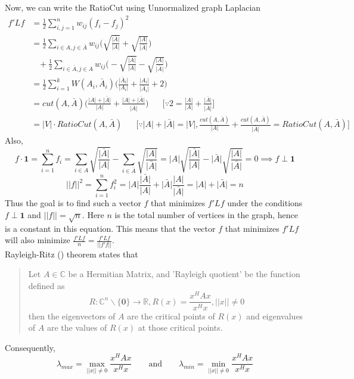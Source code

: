 \documentclass[10pt,a4paper, nocenter]{report}
\newcommand{\abs}[1]{\lvert {#1} \rvert}
\newcommand{\norm}[1]{\lvert\lvert {#1} \rvert\rvert}
\begin{document}
	Now, we can write the RatioCut using Unnormalized graph Laplacian
	\begin{align*}
		f'Lf &= \frac{1}{2}\sum_{i,j=1}^{n}w_{ij}(f_{i}-f_{j})^{2}\\
		&= \frac{1}{2} \sum_{i\in A, j\in \bar{A}} w_{ij} \bigg(\sqrt{\frac{\lvert \bar{A} \rvert}{\lvert A \rvert}} + \sqrt{\frac{\lvert A \rvert}{\lvert \bar{A} \rvert}}\bigg)\\
		& \hspace{10pt}+ \frac{1}{2} \sum_{i\in \bar{A}, j\in A} w_{ij} \bigg(-\sqrt{\frac{\lvert \bar{A} \rvert}{\lvert A \rvert}} - \sqrt{\frac{\lvert A \rvert}{\lvert \bar{A} \rvert}}\bigg)\\
		&= \frac{1}{2}\sum_{i=1}^{k}W(A_{i},\bar{A}_{i})\bigg(\frac{\lvert \bar{A}_{i} \rvert}{\lvert A_{i} \rvert} + \frac{\lvert A_{i} \rvert}{\lvert \bar{A}_{i} \rvert} + 2\bigg)\\
		&= cut(A,\bar{A})\bigg(\frac{\abs{A} + \abs{\bar{A}}}{\abs{A}} + \frac{\abs{A} + \abs{\bar{A}}}{\abs{\bar{A}}}\bigg) \hspace{20pt}\bigg[\because 2 = \frac{\abs{A}}{\abs{A}} + \frac{\abs{\bar{A}}}{\abs{\bar{A}}}\bigg]\\
		&= \abs{V}\cdot RatioCut(A,\bar{A}) \hspace{20pt} \bigg[\because \abs{A}+\abs{\bar{A}} = \abs{V}, \frac{cut(A,\bar{A})}{\abs{A}} + \frac{cut(A,\bar{A})}{\abs{\bar{A}}} = RatioCut(A,\bar{A})\bigg]
	\end{align*}
	Also,
	$$ f\cdot\mathbf{1} = \sum_{i=1}^{n}f_{i} = \sum_{i\in A} \sqrt{\frac{\abs{\bar{A}}}{\abs{A}}} - \sum_{i\in \bar{A}} \sqrt{\frac{\abs{A}}{\abs{\bar{A}}}} = \abs{A} \sqrt{\frac{\abs{\bar{A}}}{\abs{A}}} - \abs{\bar{A}} \sqrt{\frac{\abs{A}}{\abs{\bar{A}}}} =0 \implies f \perp \mathbf{1} $$
	$$ \norm{f}^{2} = \sum_{i=1}^{n}f_{i}^{2} = \abs{A} \frac{\abs{\bar{A}}}{\abs{A}} + \abs{\bar{A}} \frac{\abs{A}}{\abs{\bar{A}}} = \abs{A}+\abs{\bar{A}} = n
	$$
	Thus the goal is to find such a vector $f$ that minimizes $f'Lf$ under the conditions $f \perp \mathbf{1}$ and $\norm{f} = \sqrt{n}$. Here $n$ is the total number of vertices in the graph, hence is a constant in this equation. This means that the vector $f$ that minimizes $f'Lf$ will also minimize $\frac{f'Lf}{n} = \frac{f'Lf}{\norm{f'f}} $. \\
	
	Rayleigh-Ritz (\cite{rayleigh-ritz}) theorem states that
	\begin{quote}
		Let $A \in \mathbb{C}$ be a Hermitian Matrix, and 'Rayleigh quotient' be the function defined as $$R: \mathbb{C}^{n} \backslash \{\mathbf{0}\}\to \mathbb{R}, 
	 R(x) = \frac{x^{H}Ax}{x^{H}x}, \norm{x}\neq 0 $$ then the eigenvectors of $A$ are the critical points of $R(x)$ and eigenvalues of $A$ are the values of $R(x)$ at those critical points. 
	\end{quote}
	Consequently, 
	$$ \lambda_{max} = \max_{\norm{x}\neq 0}\frac{x^{H}Ax}{x^{H}x} \hspace{20pt} \text{ and } \hspace{20pt} \lambda_{min} = \min_{\norm{x}\neq 0}\frac{x^{H}Ax}{x^{H}x} $$
	
\end{document}
